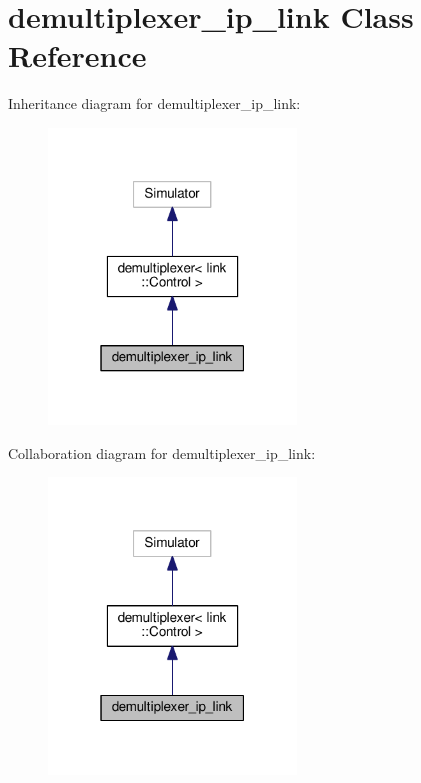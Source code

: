 \hypertarget{classdemultiplexer__ip__link}{}\section{demultiplexer\+\_\+ip\+\_\+link Class Reference}
\label{classdemultiplexer__ip__link}


Inheritance diagram for demultiplexer\+\_\+ip\+\_\+link\+:
\nopagebreak
\begin{figure}[H]
\begin{center}
\leavevmode
\includegraphics[width=187pt]{classdemultiplexer__ip__link__inherit__graph}
\end{center}
\end{figure}


Collaboration diagram for demultiplexer\+\_\+ip\+\_\+link\+:
\nopagebreak
\begin{figure}[H]
\begin{center}
\leavevmode
\includegraphics[width=187pt]{classdemultiplexer__ip__link__coll__graph}
\end{center}
\end{figure}
